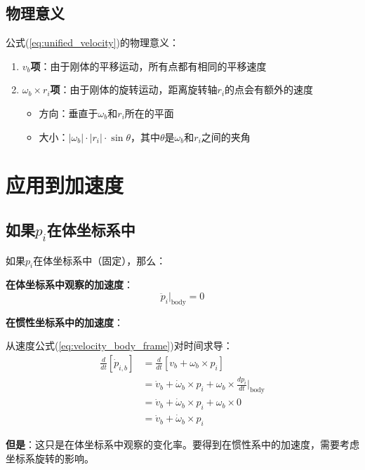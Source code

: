 \documentclass[12pt,a4paper]{article}
\begin{document}
\subsection{物理意义}

公式(\ref{eq:unified_velocity})的物理意义：

\begin{enumerate}
\item \textbf{$v_b$项}：由于刚体的平移运动，所有点都有相同的平移速度

\item \textbf{$\omega_b \times r_i$项}：由于刚体的旋转运动，距离旋转轴$r_i$的点会有额外的速度
\begin{itemize}
\item 方向：垂直于$\omega_b$和$r_i$所在的平面
\item 大小：$|\omega_b| \cdot |r_i| \cdot \sin\theta$，其中$\theta$是$\omega_b$和$r_i$之间的夹角
\end{itemize}
\end{enumerate}

\section{应用到加速度}

\subsection{如果$p_i$在体坐标系中}

如果$p_i$在体坐标系中（固定），那么：

\textbf{在体坐标系中观察的加速度}：
\begin{equation}
\ddot{p}_i\Big|_{\text{body}} = 0
\end{equation}

\textbf{在惯性坐标系中的加速度}：

从速度公式(\ref{eq:velocity_body_frame})对时间求导：
\begin{align}
\frac{d}{dt}[\dot{p}_{i,b}] &= \frac{d}{dt}[v_b + \omega_b \times p_i] \\
&= \dot{v}_b + \dot{\omega}_b \times p_i + \omega_b \times \frac{dp_i}{dt}\Big|_{\text{body}} \\
&= \dot{v}_b + \dot{\omega}_b \times p_i + \omega_b \times 0 \\
&= \dot{v}_b + \dot{\omega}_b \times p_i
\end{align}

\textbf{但是}：这只是在体坐标系中观察的变化率。要得到在惯性系中的加速度，需要考虑坐标系旋转的影响。
\end{document}
